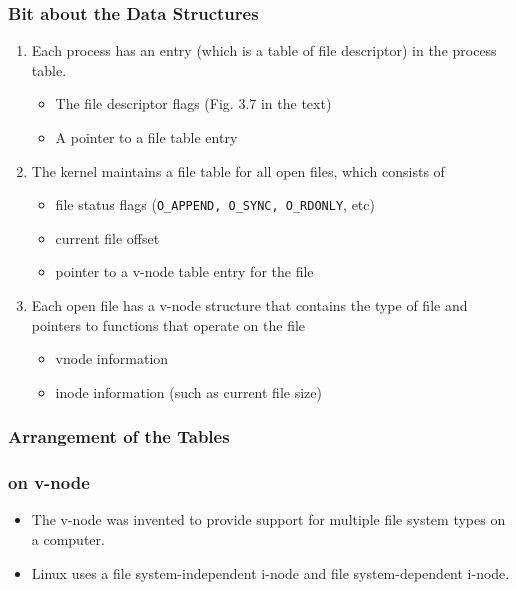 \documentclass[newPxFont,sthlmFooter,nooffset]{beamer}
\begin{document}
\begin{frame}
  \frametitle{Bit about the Data Structures}
\begin{enumerate}
\item Each process has an entry (which is a table of file descriptor) in the process table. 
  \begin{itemize}
  \item The file descriptor flags (Fig. 3.7 in the text)
  \item A pointer to a file table entry
  \end{itemize}
\item The kernel maintains a file table for all open files, which consists of
  \begin{itemize}
  \item file status flags (\texttt{O\_APPEND, O\_SYNC, O\_RDONLY}, etc)
  \item current file offset
  \item pointer to a v-node table entry for the file
  \end{itemize}
\item Each open file has a v-node structure that contains the type of file and pointers to functions that operate on the file
  \begin{itemize}
  \item vnode information
  \item inode information (such as current file size)
  \end{itemize}
\end{enumerate}
\end{frame}

\begin{frame}
  \frametitle{Arrangement of the Tables}
\centering
{}

\end{frame}


\begin{frame}[t]
  \frametitle{on v-node}
\begin{itemize}
\item The v-node was invented to provide support for multiple file system types on a computer.
\item Linux uses a file system-independent i-node and file system-dependent i-node.
\end{itemize}
\end{frame}
\end{document}
